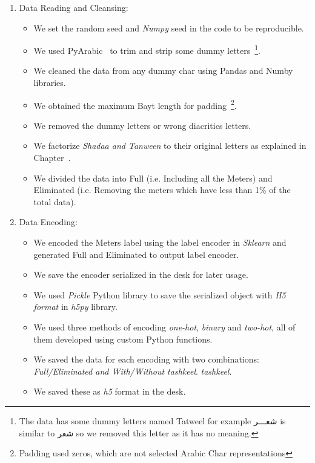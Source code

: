 \begin{enumerate}
 \item Data Reading and Cleansing:
 \begin{itemize}
 \item We set the random seed and \textit{Numpy} seed in the code to be reproducible.
 \item We used PyArabic~\cite{Pyarabic_2010} to trim and strip some dummy letters~\footnote{The data has some dummy letters named Tatweel for example \textarabic{شعـــر} is similar to \textarabic{شعر} so we removed this letter as it has no meaning.}.
 \item We cleaned the data from any dummy char using Pandas and Numby libraries.
 \item We obtained the maximum Bayt length for padding~\footnote{Padding used zeros, which are not selected Arabic Char representations}.
 \item We removed the dummy letters or wrong diacritics letters.
 \item We factorize \textit{Shadaa and Tanween} to their original letters as explained in Chapter~.
 \item We divided the data into Full (i.e. Including all the Meters) and Eliminated (i.e. Removing the meters which have less than 1\% of the total data).
 \end{itemize}
 
 \item Data Encoding:
 \begin{itemize}

 \item We encoded the Meters label using the label encoder in \textit{Sklearn} and generated Full and Eliminated to output label encoder.
 \item We save the encoder serialized in the desk for later usage.
 \item We used \textit{Pickle} Python library to save the serialized object with \textit{H5 format} in \textit{h5py} library.
 \item We used three methods of encoding \textit{one-hot}, \textit{binary} and \textit{two-hot}, all of them developed using custom Python functions.
 \item We saved the data for each encoding with two combinations: \textit{Full/Eliminated and With/Without \textit{tashkeel}}. \textit{tashkeel}.
 \item We saved these as \textit{h5} format in the desk.
 \end{itemize}


\end{enumerate}

